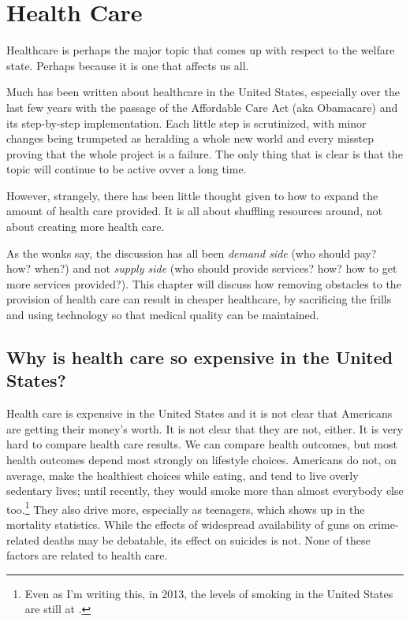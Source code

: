 \chapter{Health Care}
\label{chpt:health}

Healthcare is perhaps the major topic that comes up with respect to the welfare
state. Perhaps because it is one that affects us all.

Much has been written about healthcare in the United States, especially over
the last few years with the passage of the Affordable Care Act (aka Obamacare)
and its step-by-step implementation. Each little step is scrutinized, with
minor changes being trumpeted as heralding a whole new world and every misstep
proving that the whole project is a failure. The only thing that is clear is
that the topic will continue to be active ovver a long time.

However, strangely, there has been little thought given to how to expand the
amount of health care provided. It is all about shuffling resources around, not
about creating more health care.

As the wonks say, the discussion has all been \emph{demand side} (who should
pay? how? when?) and not \emph{supply side} (who should provide services? how?
how to get more services provided?). This chapter will discuss how removing
obstacles to the provision of health care can result in cheaper healthcare, by
sacrificing the frills and using technology so that medical quality can be
maintained.

\section{Why is health care so expensive in the United States?}

Health care is expensive in the United States and it is not clear that
Americans are getting their money's worth. It is not clear that they are not,
either. It is very hard to compare health care results. We can compare health
outcomes, but most health outcomes depend most strongly on lifestyle choices.
Americans do not, on average, make the healthiest choices while eating, and
tend to live overly sedentary lives; until recently, they would smoke more than
almost everybody else too.\footnote{Even as I'm writing this, in 2013, the
levels of smoking in the United States are still at \FIXME.} They also drive
more, especially as teenagers, which shows up in the mortality statistics.
While the effects of widespread availability of guns on crime-related deaths
may be debatable, its effect on suicides is not. None of these factors are
related to health care.

